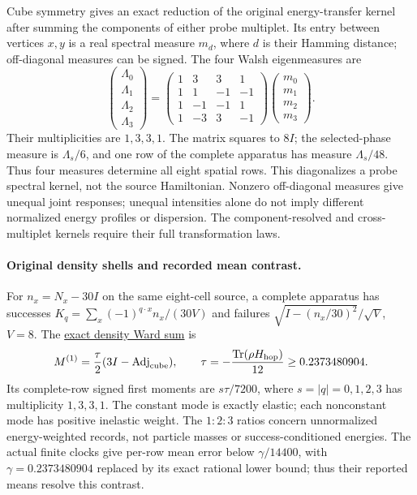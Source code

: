 Cube symmetry gives an exact reduction of the original energy-transfer
kernel after summing the components of either probe multiplet. Its entry
between vertices $x,y$ is a real spectral measure $m_d$, where $d$ is their
Hamming distance; off-diagonal measures can be signed. The four Walsh
eigenmeasures are
\[
\begin{pmatrix}\Lambda_0\\\Lambda_1\\\Lambda_2\\\Lambda_3\end{pmatrix}
=
\begin{pmatrix}1&3&3&1\\1&1&-1&-1\\1&-1&-1&1\\1&-3&3&-1\end{pmatrix}
\begin{pmatrix}m_0\\m_1\\m_2\\m_3\end{pmatrix}.
\]
Their multiplicities are $1,3,3,1$. The matrix squares to $8I$;
the selected-phase measure is $\Lambda_s/6$, and one row of the complete
apparatus has measure $\Lambda_s/48$. Thus four measures determine all
eight spatial rows. This diagonalizes a probe spectral kernel, not the
source Hamiltonian. Nonzero off-diagonal measures give unequal joint
responses; unequal intensities alone do not imply different normalized
energy profiles or dispersion. The component-resolved and cross-multiplet
kernels require their full transformation laws.

\paragraph{Original density shells and recorded mean contrast.}
For $n_x=N_x-30I$ on the same eight-cell source, a complete apparatus has
successes $K_q=\sum_x(-1)^{q\cdot x}n_x/(30V)$ and failures
$\sqrt{I-(n_x/30)^2}/\sqrt V$, $V=8$.
The \href{https://github.com/FloatingPragma/observer-patch-holography/blob/main/model/particle_primary_original_shell_moments/PROOF.md}{exact density Ward sum}
is
\[
 M^{(1)}=\frac\tau2(3I-\operatorname{Adj}_{\rm cube}),\qquad
 \tau=-\frac{\operatorname{Tr}(\rho H_{\rm hop})}{12}
       \ge0.2373480904.
\]
Its complete-row signed first moments are $s\tau/7200$, where
$s=|q|=0,1,2,3$ has multiplicity $1,3,3,1$. The constant mode is
exactly elastic; each nonconstant mode has positive inelastic weight.
The $1:2:3$ ratios concern unnormalized energy-weighted records,
not particle masses or success-conditioned energies. The actual finite
clocks give per-row mean error below $\gamma/14400$, with
$\gamma=0.2373480904$ replaced by its exact rational lower bound;
thus their reported means resolve this contrast.

